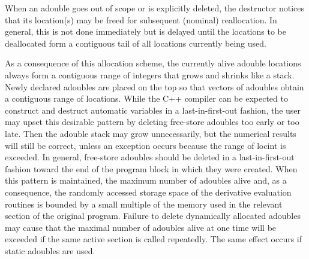 \documentclass[11pt,twoside]{article}
\begin{document}
When an {\sf adouble}
%
%
goes out of
scope or is explicitly deleted, the destructor notices that its
location(s) may be
freed for subsequent (nominal) reallocation. In general, this is not done
immediately but is delayed until the locations to be deallocated form a
contiguous tail of all locations currently being used.  

 As a consequence of this allocation scheme, the currently
alive {\sf adouble} locations always form a contiguous range of integers
that grows and shrinks like a stack. Newly declared {\sf adouble}s are
placed on the top so that vectors of {\sf adouble}s obtain a contiguous
range of locations. While the C++ compiler can be expected to construct
and destruct automatic variables in a last-in-first-out fashion, the
user may upset this desirable pattern by deleting free-store {\sf adouble}s
too early or too late. Then the {\sf adouble} stack may grow
unnecessarily, but the numerical results will still be
correct, unless an exception occurs because the range of {\sf locint}
is exceeded. In general, free-store {\sf adouble}s 
%
%
should be deleted in a last-in-first-out fashion toward the end of
the program block in which they were created.
When this pattern is maintained, the maximum number of
{\sf adouble}s alive and, as a consequence, the
randomly accessed storage space
of the derivative evaluation routines is bounded by a
small multiple of the memory used in the relevant section of the
original program. Failure to delete dynamically allocated {\sf adouble}s
may cause that the  maximal number of {\sf adouble}s alive at one time will be exceeded 
if the same active section is called repeatedly. The same effect
occurs if static {\sf adouble}s are used.
\end{document}
